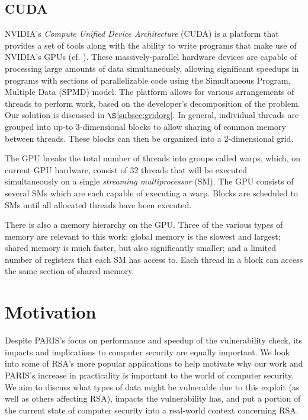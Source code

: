 \documentclass[smallextended]{svjour3}       %
\begin{document}
\subsection{CUDA}
\label{subsec:cuda}
NVIDIA's \textit{Compute Unified Device Architecture} (CUDA) is a platform that
provides a set of tools along with the ability to write programs that make use
of NVIDIA's GPUs (cf.  \cite{nvidia2012programming}). These massively-parallel
hardware devices are capable of processing large amounts of data
simultaneously, allowing significant speedups in programs with sections of
parallelizable code using the Simultaneous Program, Multiple Data (SPMD)
model. The platform allows for various arrangements of threads to perform work,
based on the developer's decomposition of the problem. Our solution is
discussed in $\S$\ref{subsec:gridorg}. In general, individual threads are grouped
into up-to 3-dimensional blocks to allow sharing of common memory between
threads. These blocks can then be organized into a 2-dimensional grid.  

The GPU breaks the total number of threads into groups called warps, which, on
current GPU hardware, consist of 32 threads that will be executed
simultaneously on a single \textit{streaming multiprocessor} (SM). The GPU
consists of several SMs which are each capable of executing a warp. Blocks are
scheduled to SMs until all allocated threads have been executed. 

There is also a memory hierarchy on the GPU. Three of the various types of
memory are relevant to this work: global memory is the slowest and largest;
shared memory is much faster, but also significantly smaller; and a limited
number of registers that each SM has access to. Each thread in a block can
access the same section of shared memory.


\section{Motivation}
\label{sec:motivation}
Despite PARIS's focus on performance and speedup of the vulnerability check,
its impacts and implications to computer security are equally important.
We look into some of RSA's more popular applications to help motivate why our
work and PARIS's increase in practicality is important to the world of computer
security. We aim to discuss what types of data might be vulnerable due to this
exploit (as well as others affecting RSA), impacts the vulnerability has, and
put a portion of the current state of computer security into a real-world
context concerning RSA.
\end{document}
